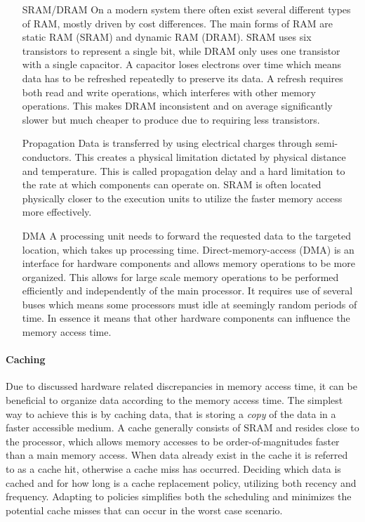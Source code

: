 \documentclass{article}
\begin{document}
\begin{itemize}
    \item [SRAM/DRAM]
    On a modern system there often exist several different types of RAM, mostly driven by cost differences.
    The main forms of RAM are static RAM (SRAM) and dynamic RAM (DRAM).
    SRAM uses six transistors to represent a single bit, while DRAM only uses one transistor with a single capacitor. 
    A capacitor loses electrons over time which means data has to be refreshed repeatedly to preserve its data.
    A refresh requires both read and write operations, which interferes with other memory operations.
    This makes DRAM inconsistent and on average significantly slower but much cheaper to produce due to requiring less transistors.\cite{memory}

    \item [Propagation]
    Data is transferred by using electrical charges through semi-conductors.
    This creates a physical limitation dictated by physical distance and temperature.
    This is called propagation delay and a hard limitation to the rate at which components can operate on.
    SRAM is often located physically closer to the execution units to utilize the faster memory access more effectively.
 
    \item [DMA]
    A processing unit needs to forward the requested data to the targeted location, which takes up processing time.
    Direct-memory-access (DMA) is an interface for hardware components and allows memory operations to be more organized.
    This allows for large scale memory operations to be performed efficiently and independently of the main processor.
    It requires use of several buses which means some processors must idle at seemingly random periods of time.
    In essence it means that other hardware components can influence the memory access time.
 
\end{itemize}

\newpage

\paragraph{Caching}

Due to discussed hardware related discrepancies in memory access time, it can be beneficial to organize data according to the memory access time.
The simplest way to achieve this is by caching data, that is storing a {\it copy} of the data in a faster accessible medium.
A cache generally consists of SRAM and resides close to the processor, which allows memory accesses to be order-of-magnitudes faster than a main memory access\cite{memory}.
When data already exist in the cache it is referred to as a cache hit, otherwise a cache miss has occurred.
Deciding which data is cached and for how long is a cache replacement policy, utilizing both recency and frequency.
Adapting to policies simplifies both the scheduling and minimizes the potential cache misses that can occur in the worst case scenario.
\end{document}
